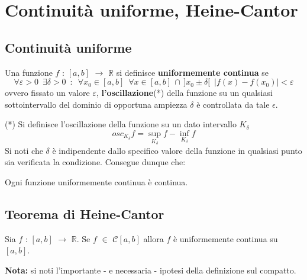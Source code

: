 \documentclass[10pt, oneside]{book}
\theoremstyle{plain}
\begin{document}
\section{Continuità uniforme, Heine-Cantor}
\subsection{Continuità uniforme}
\begin{defin}
    Una funzione $f$ : $[a,b]$ $\rightarrow$ $\mathbb{R}$ si definisce \textbf{uniformemente continua} se
    \[\forall \varepsilon > 0 \enspace \exists \delta > 0 \enspace : \enspace \forall x_0 \in [a,b] \enspace \forall x \in [a,b] \, \cap \,  ]x_0 \pm \delta[ \enspace |f(x) - f(x_0)| < \varepsilon\]
    ovvero fissato un valore $\varepsilon$, \textbf{l'oscillazione}(*) della funzione su un qualsiasi sottointervallo del dominio di opportuna ampiezza $\delta$ è controllata da tale $\epsilon$.
\end{defin}
(*) Si definisce l'oscillazione della funzione su un dato intervallo $K_\delta$
\[osc_{K_\delta} f = \sup\limits_{K_\delta} f - \inf\limits_{K_\delta} f\]
Si noti che $\delta$ è indipendente dallo specifico valore della funzione in qualsiasi punto sia verificata la condizione. Consegue dunque che:

\begin{oss}
    Ogni funzione uniformemente continua è continua.
\end{oss}

\subsection{Teorema di Heine-Cantor}
\begin{ther}[di H.-C.]
    Sia $f$ : $[a,b]$ $\rightarrow$ $\mathbb{R}$. Se $f$ $\in$ $\mathcal{C}[a,b]$ allora $f$ è uniformemente continua su $[a,b]$.
\end{ther}
\textbf{Nota: } si noti l'importante - e necessaria - ipotesi della definizione sul compatto. 
\end{document}
